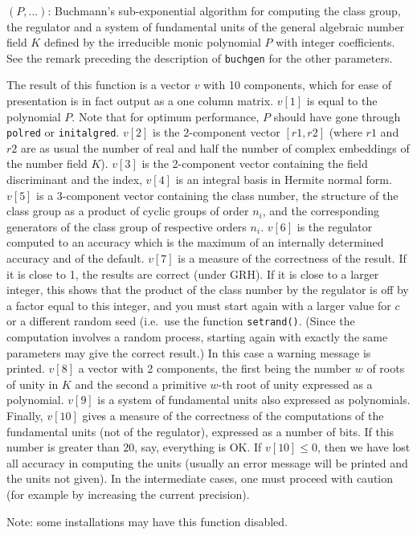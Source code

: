 $(P,...)$: Buchmann's sub-exponential algorithm for
computing the class group, the regulator and a system of fundamental units of
the general algebraic number field $K$ defined by the irreducible monic 
polynomial $P$ with integer coefficients. See the remark preceding the
description of {\tt buchgen} for the other parameters.

The result of this function is a vector $v$ with 10 components, which for
ease of presentation is in fact output as a one column matrix. $v[1]$ is 
equal to the polynomial $P$. Note that for optimum performance, $P$ should
have gone through {\tt polred} or {\tt initalgred}. $v[2]$ is the 2-component
vector $[r1,r2]$ (where $r1$ and $r2$ are as usual the number of real and 
half the number of complex embeddings of the number field $K$). $v[3]$ is the
2-component vector containing the field discriminant and the index, $v[4]$ is
an integral basis in Hermite normal form. $v[5]$ is a 3-component vector
containing the class number, the structure of the class group as a product
of cyclic groups of order $n_i$, and the corresponding generators of the
class group of respective orders $n_i$. $v[6]$ is the regulator computed to
an accuracy which is the maximum of an internally determined accuracy and 
of the default. $v[7]$ is a measure of the correctness of the result. If it
is close to 1, the results are correct (under GRH). If it is close to a 
larger integer, this shows that
the product of the class number by the regulator is off by a factor equal to 
this integer, and you must start again with a larger value for $c$
or a different random seed (i.e.~use the function {\tt setrand()}.
(Since the computation involves a random process,
starting again with exactly the same parameters may give the correct result.)
In this case a warning message is printed. $v[8]$ a vector with 2 components,
the first being the number $w$ of roots of unity in $K$ and the second a 
primitive $w$-th root of unity expressed as a polynomial.
$v[9]$ is a system of fundamental units also expressed as polynomials.
Finally, $v[10]$ gives a measure of the correctness of the computations of
the fundamental units (not of the regulator), expressed as a number of bits.
If this number is greater than $20$, say, everything is OK. If $v[10]\le0$,
then we have lost all accuracy in computing the units (usually an error
message will be printed and the units not given). In the intermediate
cases, one must proceed with caution (for example by increasing the current
precision).

Note: some installations may have this function disabled.

